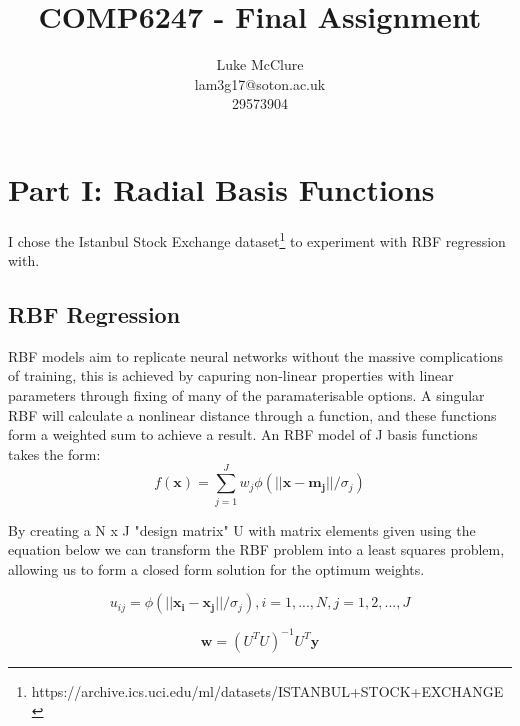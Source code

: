 \documentclass[sigconf]{acmart}
\begin{document}
\title{COMP6247 - Final Assignment}
\author{Luke McClure \\ lam3g17@soton.ac.uk \\ 29573904}

\maketitle

\section{Part I: Radial Basis Functions}
I chose the Istanbul Stock Exchange dataset\footnote{https://archive.ics.uci.edu/ml/datasets/ISTANBUL+STOCK+EXCHANGE} to experiment with RBF regression with.
\subsection{RBF Regression}
RBF models aim to replicate neural networks without the massive complications of training, this is achieved by capuring non-linear properties with linear parameters through fixing of many of the paramaterisable options.
A singular RBF will calculate a nonlinear distance through a function, and these functions form a weighted sum to achieve a result.
An RBF model of J basis functions takes the form:
\begin{equation}
  f(\mathbf{x}) = \sum^J_{j=1}w_j\phi(||\mathbf{x}-\mathbf{m_j}||/\sigma_j)
\end{equation}

By creating a N x J "design matrix" U with matrix elements given using the equation below we can transform the RBF problem into a least squares problem, allowing us to form a closed form solution for the optimum weights.

\begin{equation}
  u_{ij}=\phi(||\mathbf{x_i}-\mathbf{x_j}||/\sigma_j), i=1,...,N, j=1,2,...,J
\end{equation}

\begin{equation}
  \mathbf{w} = (U^TU)^{-1}U^T\mathbf{y}
\end{equation}
\end{document}
